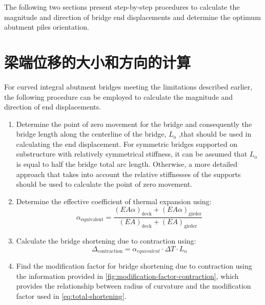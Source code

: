 The following two sections present step-by-step procedures to calculate the magnitude and direction of bridge end displacements and determine the optimum abutment piles orientation.

\section{梁端位移的大小和方向的计算}
For curved integral abutment bridges meeting the limitations described earlier, the following procedure can be employed to calculate the magnitude and direction of end displacements.
\begin{enumerate}
  \item Determine the point of zero movement for the bridge and consequently the bridge length along the centerline of the bridge, $L_\text{o}$ ,that should be used in calculating the end displacement. For symmetric bridges supported on substructure with relatively symmetrical stiffness, it can be assumed that $L_\text{o}$ is equal to half the bridge total arc length. Otherwise, a more detailed approach that takes into account the relative stiffnesses of the supports should be used to calculate the point of zero movement.
  \item Determine the effective coefficient of thermal expansion using:
  \begin{equation}
    \alpha_\text{equivalent} = \frac{(EA\alpha)_\text{deck} +(EA\alpha)_\text{girder} }{(EA)_\text{deck} + (EA)_\text{girder}}
  \end{equation}
  \item Calculate the bridge shortening due to contraction using:
  \begin{equation}
    \Delta_\text{contraction}= \alpha_{equivalent}\cdot \Delta T \cdot L_\text{o}
  \end{equation}
  \item Find the modification factor for bridge shortening due to contraction using the information provided in \cref{fig:modification-factor-contraction}, which provides the relationship between radius of curvature and the modification factor used in \cref{eq:total-shortening}.
  \begin{figure}

\end{figure}
\end{enumerate}
